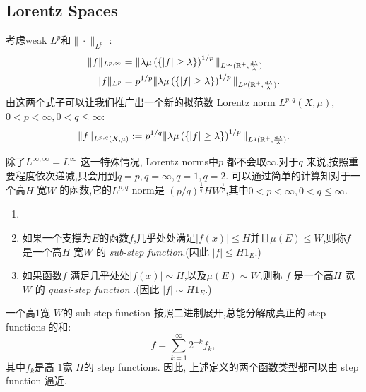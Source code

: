 \subsection{Lorentz Spaces}
考虑weak $L^{p}$和$\|\cdot \|_{L^{p}}$ :
\begin{equation*}
  \begin{aligned}
    \|f\|_{L^{p,\infty}} & = \|\lambda \mu\left( \left\{ |f|\ge \lambda \right\}  \right) ^{1 /p}\|_{L^{\infty}(\mathbb{R}^{+},\frac{\mathrm{d}\lambda}{\lambda})}\\
    \|f\|_{L^{p}} & = p^{1 /p}\|\lambda\mu\left( \left\{ |f|\ge \lambda \right\}  \right) ^{1 /p}\|_{L^{p}(\mathbb{R}^{+}, \frac{\mathrm{d}\lambda}{\lambda})}.
  \end{aligned}
\end{equation*}
由这两个式子可以让我们推广出一个新的拟范数 Lorentz norm $L^{p,q}(X,\mu)$,$0<p<\infty,0<q\le \infty$:
\[
  \|f\|_{L^{p,q}(X,\mu)}:=p^{1 /q}\|\lambda \mu\left( \left\{ |f|\ge \lambda \right\}  \right) ^{1 /p}\|_{L^{q}(\mathbb{R}^{+}, \frac{\mathrm{d}\lambda}{\lambda})}.
\]

除了$L^{\infty,\infty}=L^{\infty}$ 这一特殊情况, Lorentz norms中$p$ 都不会取$\infty$.对于$q$ 来说,按照重要程度依次递减,只会用到$q=p,q=\infty,q=1,q=2$.
可以通过简单的计算知对于一个高$H$ 宽$W$ 的函数,它的$L^{p,q}$ norm是 $(p /q)^{\frac{1}{q}}HW^{\frac{1}{p}}$,其中$0<p<\infty,0<q\le \infty$.

\begin{definition}
  \begin{enumerate}
    \item []
    \item  如果一个支撑为$E$的函数$f$,几乎处处满足$|f(x)|\le H$并且$\mu(E)\le W$,则称$f$ 是一个高$H$ 宽$W$ 的\textit{ sub-step function}.(因此 $|f|\le H 1_{E}$.)
    \item 如果函数$f$ 满足几乎处处$|f(x)|\sim H$,以及$\mu(E)\sim W$,则称 $f$ 是一个高$H$ 宽$W$ 的 \textit{quasi-step function} .(因此 $|f|\sim H 1_E$.)
  \end{enumerate}
\end{definition}

一个高$1$宽 $W$的 sub-step function 按照二进制展开,总能分解成真正的 step functions 的和:
\[
f=\sum_{k=1}^{\infty} 2^{-k}f_k,
\] 
其中$f_k$是高 $1$宽 $H$的 step functions.
因此, 上述定义的两个函数类型都可以由 step function 逼近.

